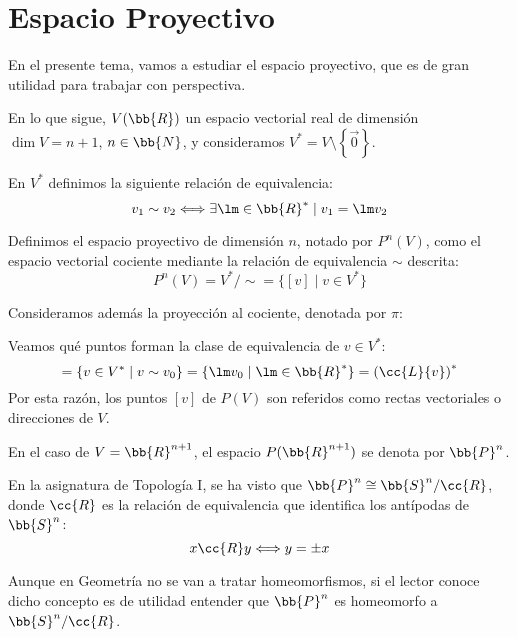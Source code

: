 \chapter{Espacio Proyectivo}

En el presente tema, vamos a estudiar el espacio proyectivo, que es de gran utilidad para trabajar con perspectiva.

En lo que sigue, $V(\bb{R})$ un espacio vectorial real de dimensión $\dim V = n+1$, $n\in \bb{N}$, y consideramos $V^\ast = V\setminus \left\{\vec{0}\right\}$.

\begin{definicion}
    En $V^\ast$ definimos la siguiente relación de equivalencia:
    \begin{equation*}
        v_1 \sim v_2 \Longleftrightarrow \exists \lm \in \bb{R}^\ast \mid v_1=\lm v_2
    \end{equation*}
    
    Definimos el espacio proyectivo de dimensión $n$, notado por $P^n(V)$, como el espacio vectorial cociente mediante la relación de equivalencia $\sim$ descrita:
    \begin{equation*}
        P^n(V) = V^\ast/\sim = \{[v]\mid v\in V^\ast\}
    \end{equation*}

    Consideramos además la proyección al cociente, denotada por $\pi$:
\end{definicion}

Veamos qué puntos forman la clase de equivalencia de $v\in V^\ast$:
\begin{equation*}
    [v] = \{v\in V^\ast \mid v\sim v_0\} = \{\lm v_0 \mid \lm \in \bb{R}^\ast\} = \left(\cc{L}\{v\}\right)^\ast
\end{equation*}
Por esta razón, los puntos $[v]$ de $P(V)$ son referidos como rectas vectoriales o direcciones de $V$.


\begin{notacion}
    En el caso de $V=\bb{R}^{n+1}$, el espacio $P(\bb{R}^{n+1})$ se denota por $\bb{P}^n$.
\end{notacion}
\begin{observacion}
    En la asignatura de Topología I, se ha visto que $\bb{P}^n \cong \bb{S}^n/\cc{R}$, donde $\cc{R}$ es la relación de equivalencia que identifica los antípodas de $\bb{S}^n$:
    \begin{equation*}
        x \cc{R} y \Longleftrightarrow y = \pm x
    \end{equation*}

    Aunque en Geometría no se van a tratar homeomorfismos, si el lector conoce dicho concepto es de utilidad entender que $\bb{P}^n$ es homeomorfo a $\bb{S}^n/\cc{R}$.
\end{observacion}


